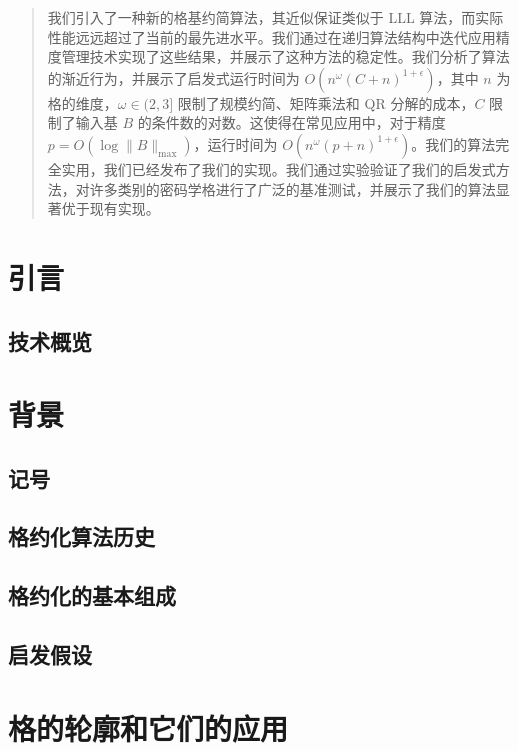 \documentclass[UTF8]{ctexart}
\begin{document}
\begin{abstract}
我们引入了一种新的格基约简算法，其近似保证类似于 LLL 算法，而实际性能远远超过了当前的最先进水平。我们通过在递归算法结构中迭代应用精度管理技术实现了这些结果，并展示了这种方法的稳定性。我们分析了算法的渐近行为，并展示了启发式运行时间为 $O(n^\omega (C + n)^{1+\epsilon})$，其中 $n$ 为格的维度，$\omega \in (2, 3]$ 限制了规模约简、矩阵乘法和 QR 分解的成本，$C$ 限制了输入基 $B$ 的条件数的对数。这使得在常见应用中，对于精度 $p = O(\log \|B\|_{\max})$，运行时间为 $O(n^\omega (p + n)^{1+\epsilon})$。我们的算法完全实用，我们已经发布了我们的实现。我们通过实验验证了我们的启发式方法，对许多类别的密码学格进行了广泛的基准测试，并展示了我们的算法显著优于现有实现。
\end{abstract}

\section{引言}

    \subsection{技术概览}

\section{背景}

    \subsection{记号}

    \subsection{格约化算法历史}

    \subsection{格约化的基本组成}

    \subsection{启发假设}

\section{格的轮廓和它们的应用}
\end{document}

